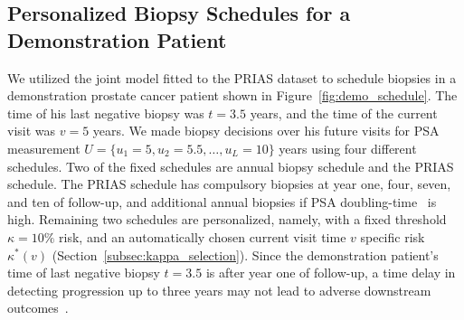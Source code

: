 \subsection{Personalized Biopsy Schedules for a Demonstration Patient}
\label{subsec:demo_patient}
We utilized the joint model fitted to the PRIAS dataset to schedule biopsies in a demonstration prostate cancer patient shown in Figure~\ref{fig:demo_schedule}. The time of his last negative biopsy was $t=3.5$ years, and the time of the current visit was $v=5$ years. We made biopsy decisions over his future visits for PSA measurement $U=\{u_1=5, u_2=5.5,\ldots,u_L=10\}$ years using four different schedules. Two of the fixed schedules are annual biopsy schedule and the PRIAS schedule. The PRIAS schedule has compulsory biopsies at year one, four, seven, and ten of follow-up, and additional annual biopsies if PSA doubling-time~\citep{bokhorst2015compliance} is high. Remaining two schedules are personalized, namely, with a fixed threshold $\kappa=10\%$ risk, and an automatically chosen current visit time $v$ specific risk $\kappa^*(v)$ (Section~\ref{subsec:kappa_selection}). Since the demonstration patient's time of last negative biopsy $t=3.5$ is after year one of follow-up, a time delay in detecting progression
up to three years may not lead to adverse downstream outcomes~\citep{carvalho}.

